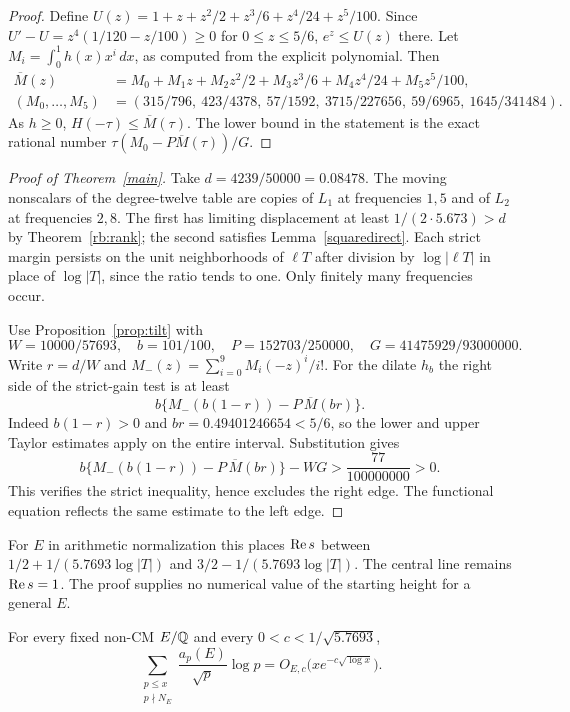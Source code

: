 \documentclass[11pt]{article}
\begin{document}
\begin{proof}
Define $U(z)=1+z+z^2/2+z^3/6+z^4/24+z^5/100$. Since $U'-U=z^4(1/120-z/100)\ge0$ for $0\le z\le5/6$, $e^z\le U(z)$ there. Let $M_i=\int_0^1h(x)x^i\,dx$, as computed from the explicit polynomial. Then
\[
\begin{split}
 \overline M(z)&=M_0+M_1z+M_2z^2/2+M_3z^3/6+M_4z^4/24+M_5z^5/100,\\
 (M_0,\ldots,M_5)&=(315/796,\ 423/4378,\ 57/1592,\ 3715/227656,\ 59/6965,\ 1645/341484).
\end{split}
\]
As $h\ge0$, $H(-\tau)\le\overline M(\tau)$. The lower bound in the statement is the exact rational number $\tau(M_0-P\overline M(\tau))/G$.
\end{proof}
\begin{proof}[Proof of Theorem~\ref{main}]
Take $d=4239/50000=0.08478$. The moving nonscalars of the degree-twelve table are copies of $L_1$ at frequencies $1,5$ and of $L_2$ at frequencies $2,8$. The first has limiting displacement at least $1/(2\cdot5.673)>d$ by Theorem~\ref{rb:rank}; the second satisfies Lemma~\ref{squaredirect}. Each strict margin persists on the unit neighborhoods of $\ell T$ after division by $\log|\ell T|$ in place of $\log|T|$, since the ratio tends to one. Only finitely many frequencies occur.
 
Use Proposition~\ref{prop:tilt} with
\[
 W=10000/57693,\quad b=101/100,\quad
 P=152703/250000,\quad G=41475929/93000000 .
\]
Write $r=d/W$ and $M_-(z)=\sum_{i=0}^9 M_i(-z)^i/i!$. For the dilate $h_b$ the right side of the strict-gain test is at least
\[
 b\{M_-(b(1-r))-P\,\overline M(br)\}.
\]
Indeed $b(1-r)>0$ and $br=0.49401246654<5/6$, so the lower and upper Taylor estimates apply on the entire interval. Substitution gives
\[
 b\{M_-(b(1-r))-P\,\overline M(br)\}-WG
     >\frac{77}{100000000}>0 .
\]
This verifies the strict inequality, hence excludes the right edge. The functional equation reflects the same estimate to the left edge.
\end{proof}
For $E$ in arithmetic normalization this places $\operatorname{Re} s$ between $1/2+1/(5.7693\log|T|)$ and $3/2-1/(5.7693\log|T|)$. The central line remains $\operatorname{Re} s=1$. The proof supplies no numerical value of the starting height for a general $E$.
\begin{corollary}
For every fixed non-CM $E/\mathbb Q$ and every $0<c<1/\sqrt{5.7693}$,
\[
 \sum_{\substack{p\le x\\p\nmid N_E}}\frac{a_p(E)}{\sqrt p}\log p
   =O_{E,c}\big(xe^{-c\sqrt{\log x}}\big).
\]
\end{corollary}
\end{document}
